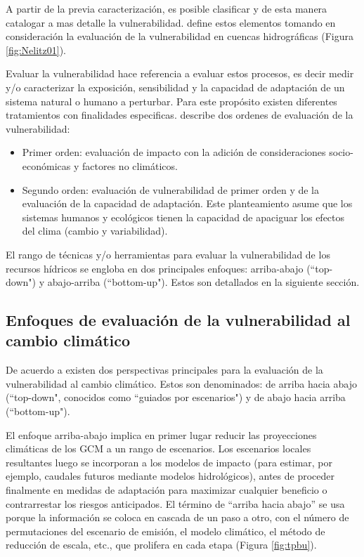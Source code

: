 \documentclass[12pt]{article}
\begin{document}
\clearpage
A partir de la previa caracterización, es posible clasificar y de esta manera catalogar a mas detalle la vulnerabilidad. \citet{nelitz2013tools} define estos elementos tomando en consideración la evaluación de la vulnerabilidad en cuencas hidrográficas (Figura \ref{fig:Nelitz01}).

Evaluar la vulnerabilidad hace referencia a evaluar estos procesos, es decir medir y/o caracterizar la exposición, sensibilidad y la capacidad de adaptación de un sistema natural o humano a perturbar. Para este propósito existen diferentes tratamientos con finalidades especificas. \citet{nelitz2013tools} describe dos ordenes de evaluación de la vulnerabilidad:

\begin{itemize}
    \item Primer orden: evaluación de impacto con la adición de consideraciones socio-económicas y factores no climáticos.
    \item Segundo orden: evaluación de vulnerabilidad de primer orden y de la evaluación de la capacidad de adaptación. Este planteamiento asume que los sistemas humanos y ecológicos tienen la capacidad de apaciguar los efectos del clima (cambio y variabilidad).
\end{itemize}

El rango de técnicas y/o herramientas para evaluar la vulnerabilidad de los recursos hídricos se engloba en dos principales enfoques: arriba-abajo (“top-down") y abajo-arriba (“bottom-up"). Estos son detallados en la siguiente sección.



\subsection{Enfoques de evaluación de la vulnerabilidad al cambio climático}

De acuerdo a \citet{Wilby2010} existen dos perspectivas principales para la evaluación de la vulnerabilidad al cambio climático. Estos son denominados: de arriba hacia abajo (“top-down", conocidos como ``guiados por escenarios") y de abajo hacia arriba (“bottom-up").

El enfoque arriba-abajo implica en primer lugar reducir las proyecciones climáticas de los GCM a un rango de escenarios. Los escenarios locales resultantes luego se incorporan a los modelos de impacto (para estimar, por ejemplo, caudales futuros mediante modelos hidrológicos), antes de proceder finalmente en medidas de adaptación para maximizar cualquier beneficio o contrarrestar los riesgos anticipados. El término de “arriba hacia abajo” se usa porque la información se coloca en cascada de un paso a otro, con el número de permutaciones del escenario de emisión, el modelo climático, el método de reducción de escala, etc., que prolifera en cada etapa (Figura \ref{fig:tpbu}). 
\end{document}
